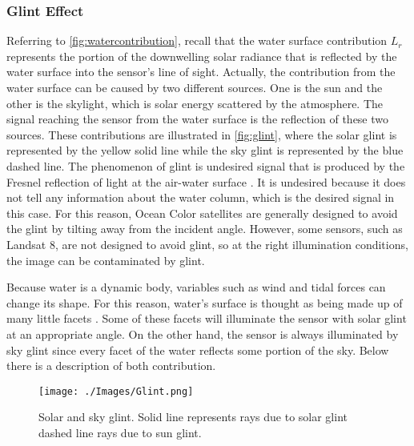 \subsubsection{Glint Effect}
Referring to \autoref{fig:watercontribution}, recall that the water surface contribution $L_r$ represents the portion of the downwelling solar radiance that is reflected by the water surface into the sensor's line of sight. Actually, the contribution from the water surface can be caused by two different sources. One is the sun and the other is the skylight, which is solar energy scattered by the atmosphere. The signal reaching the sensor from the water surface is the reflection of these two sources. These contributions are illustrated in \autoref{fig:glint}, where the solar glint is represented by the yellow solid line while the sky glint is represented by the blue dashed line. The phenomenon of glint is undesired signal that is produced by the Fresnel reflection of light at the air-water surface \cite{GeraceThesis}. It is undesired because it does not tell any information about the water column, which is the desired signal in this case. For this reason, Ocean Color satellites are generally designed to avoid the glint by tilting away from the incident angle. However, some sensors, such as Landsat 8, are not designed to avoid glint, so at the right illumination conditions, the image can be contaminated by glint.

Because water is a dynamic body, variables such as wind and tidal forces can change its shape. For this reason, water's surface is thought as being made up of many little facets \cite{GeraceThesis}. Some of these facets will illuminate the sensor with solar glint at an appropriate angle. On the other hand, the sensor is always illuminated by sky glint since every facet of the water reflects some portion of the sky. Below there is a description of both contribution. 

\begin{figure}[htb]
\centering
\texttt{[image: ./Images/Glint.png]}
\caption{Solar and sky glint. Solid line represents rays due to solar glint dashed line rays due to sun glint.} 
\label{fig:glint}
\end{figure}
